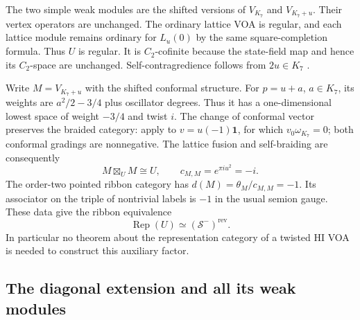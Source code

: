 \documentclass[11pt,a4paper]{article}
\numberwithin{equation}{section}
\theoremstyle{definition}\newtheorem{definition}[theorem]{Definition}
\theoremstyle{remark}\newtheorem{remark}[theorem]{Remark}
\begin{document}
The two simple weak modules are the shifted versions of $V_{K_7}$
and $V_{K_7+u}$. Their vertex operators are unchanged.
The ordinary lattice VOA is regular, and each lattice module remains
ordinary for $L_u(0)$ by the same square-completion formula.
Thus $U$ is regular. It is $C_2$-cofinite because the state-field
map and hence its $C_2$-space are unchanged. Self-contragredience
follows from $2u\in K_7$
\cite[Theorems 3.1, 4.1, 4.4]{dongmason}.

Write $M=V_{K_7+u}$ with the shifted conformal structure.
For $p=u+a$, $a\in K_7$, its weights are
$a^2/2-3/4$ plus oscillator degrees. Thus it has a one-dimensional
lowest space of weight $-3/4$ and twist $i$.
The change of conformal vector preserves the braided category:
apply \cite[Proposition 2.17]{mcrae} to
$v=u(-1)\mathbf1$, for which $v_0\omega_{K_7}=0$;
both conformal gradings are nonnegative.
The lattice fusion and self-braiding are consequently
\[
 M\boxtimes_U M\cong U,
 \qquad c_{M,M}=e^{\pi i u^2}=-i.
\]
The order-two pointed ribbon category has
$d(M)=\theta_M/c_{M,M}=-1$.
Its associator on the triple of nontrivial labels is $-1$ in the
usual semion gauge. These data give the ribbon equivalence
\begin{equation}\label{eq:inverse-E7}
            \operatorname{Rep}(U)\simeq(\mathcal S^-)^{\mathrm{rev}}.
\end{equation}
In particular no theorem about the representation category of a
twisted HI VOA is needed to construct this auxiliary factor.

\subsection{The diagonal extension and all its weak modules}
\end{document}
